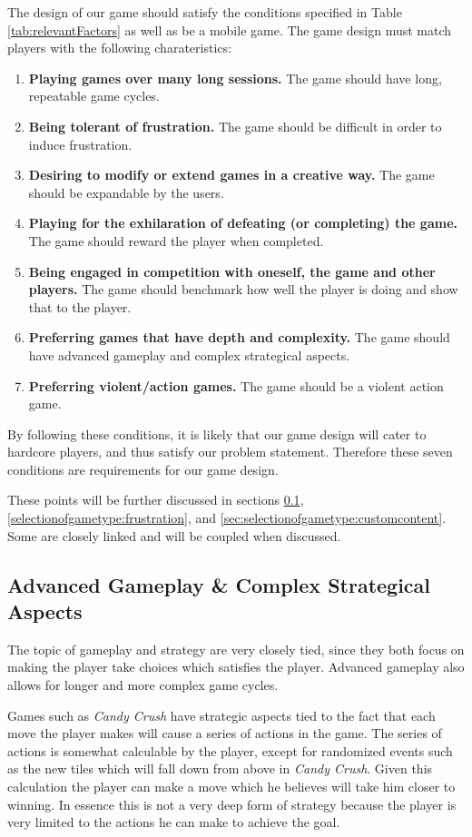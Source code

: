 The design of our game should satisfy the conditions specified in Table \ref{tab:relevantFactors} as well as be a mobile game.
The game design must match players with the following charateristics:
\begin{enumerate}\label{gamedesign:selectionofgametype:importantstuff}
\item \textbf{Playing games over many long sessions.} The game should have long, repeatable game cycles.
\item \textbf{Being tolerant of frustration.} The game should be difficult in order to induce frustration.
\item \textbf{Desiring to modify or extend games in a creative way.} The game should be expandable by the users.
\item \textbf{Playing for the exhilaration of defeating (or completing) the game.} The game should reward the player when completed.
\item \textbf{Being engaged in competition with oneself, the game and other players.} The game should benchmark how well the player is doing and show that to the player.
\item \textbf{Preferring games that have depth and complexity.} The game should have advanced gameplay and complex strategical aspects.
\item \textbf{Preferring violent/action games.} The game should be a violent action game.
\end{enumerate}
By following these conditions, it is likely that our game design will cater to hardcore players, and thus satisfy our problem statement. 
Therefore these seven conditions are requirements for our game design.

These points will be further discussed in sections \ref{selectionofgametype:advancedgameplay}, \ref{selectionofgametype:frustration}, and \ref{sec:selectionofgametype:customcontent}.
Some are closely linked and will be coupled when discussed.

\subsection{Advanced Gameplay \& Complex Strategical Aspects}\label{selectionofgametype:advancedgameplay}
The topic of gameplay and strategy are very closely tied, since they both focus on making the player take choices which satisfies the player.
Advanced gameplay also allows for longer and more complex game cycles.

Games such as \textit{Candy Crush}\cite{candycrush} have strategic aspects tied to the fact that each move the player makes will cause a series of actions in the game.
The series of actions is somewhat calculable by the player, except for randomized events such as the new tiles which will fall down from above in \textit{Candy Crush}.
Given this calculation the player can make a move which he believes will take him closer to winning.
In essence this is not a very deep form of strategy because the player is very limited to the actions he can make to achieve the goal.

